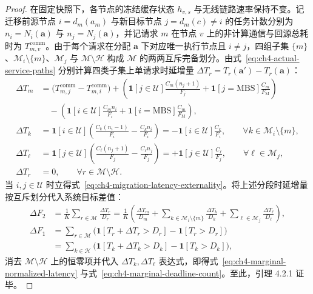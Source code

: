 \begin{proof}
在固定快照下，各节点的冻结缓存状态 $h_{v,s}$ 与无线链路速率保持不变。记迁移前源节点 $i=d_m(a_m)$ 与新目标节点 $j=d_m(c)\neq i$ 的任务计数分别为 $n_i=N_i(\mathbf{a})$ 与 $n_j=N_j(\mathbf{a})$，并记请求 $m$ 在节点 $v$ 上的非计算通信与回源总耗时为 $T_{m,v}^{\mathrm{comm}}$。由于每个请求在分配 $\mathbf{a}$ 下对应唯一执行节点且 $i\neq j$，四组子集 $\{m\}$、$\mathcal{M}_i\setminus\{m\}$、$\mathcal{M}_j$ 与 $\mathcal{M}\setminus\mathcal{H}$ 构成 $\mathcal{M}$ 的两两互斥完备划分。由式~\eqref{eq:ch4-actual-service-paths} 分别计算四类子集上单请求时延增量 $\Delta T_r=T_r(\mathbf{a}')-T_r(\mathbf{a})$：
\begin{align*}
    \Delta T_m&=\big(T_{m,j}^{\mathrm{comm}}-T_{m,i}^{\mathrm{comm}}\big)
      +\left(\mathbf{1}[j\in\mathcal{U}]\frac{C_m(n_j+1)}{F_j}+\mathbf{1}[j=\mathrm{MBS}]\frac{C_m}{F_{\mathrm{M}}}\right) \\
    &\quad-\left(\mathbf{1}[i\in\mathcal{U}]\frac{C_m n_i}{F_i}+\mathbf{1}[i=\mathrm{MBS}]\frac{C_m}{F_{\mathrm{M}}}\right), \\
    \Delta T_k&=\mathbf{1}[i\in\mathcal{U}]\left(\frac{C_k(n_i-1)}{F_i}-\frac{C_k n_i}{F_i}\right)
      =-\mathbf{1}[i\in\mathcal{U}]\frac{C_k}{F_i},\qquad\forall k\in\mathcal{M}_i\setminus\{m\}, \\
    \Delta T_\ell&=\mathbf{1}[j\in\mathcal{U}]\left(\frac{C_\ell(n_j+1)}{F_j}-\frac{C_\ell n_j}{F_j}\right)
      =+\mathbf{1}[j\in\mathcal{U}]\frac{C_\ell}{F_j},\qquad\forall \ell\in\mathcal{M}_j, \\
    \Delta T_r&=0,\qquad\forall r\in\mathcal{M}\setminus\mathcal{H}.
\end{align*}
当 $i,j\in\mathcal{U}$ 时立得式~\eqref{eq:ch4-migration-latency-externality}。将上述分段时延增量按互斥划分代入系统目标差值：
\begin{align*}
    \Delta F_2&=\frac{1}{K}\sum_{r\in\mathcal{M}}\frac{\Delta T_r}{D_r}
      =\frac{1}{K}\left(\frac{\Delta T_m}{D_m}
      +\sum_{k\in\mathcal{M}_i\setminus\{m\}}\frac{\Delta T_k}{D_k}
      +\sum_{\ell\in\mathcal{M}_j}\frac{\Delta T_\ell}{D_\ell}\right), \\
    \Delta F_1&=\sum_{r\in\mathcal{M}}\Big(\mathbf{1}[T_r+\Delta T_r>D_r]-\mathbf{1}[T_r>D_r]\Big) \\
    &=\sum_{k\in\mathcal{H}}\Big(\mathbf{1}[T_k+\Delta T_k>D_k]-\mathbf{1}[T_k>D_k]\Big),
\end{align*}
消去 $\mathcal{M}\setminus\mathcal{H}$ 上的恒零项并代入 $\Delta T_k,\Delta T_\ell$ 表达式，即得式~\eqref{eq:ch4-marginal-normalized-latency} 与式~\eqref{eq:ch4-marginal-deadline-count}。至此，引理 4.2.1 证毕。
\end{proof}

